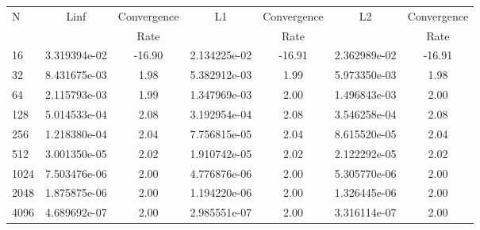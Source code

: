 \documentclass[12pt]{article}
\begin{document}
	\begin{tabular}{l|c|c|c|c|c|c}
		N&Linf&Convergence&L1&Convergence&L2&Convergence\\
		&&Rate&&Rate&&Rate\\
		\hline
		16&3.319394e-02&-16.90&2.134225e-02&-16.91&2.362989e-02&-16.91\\
		\hline
		32&8.431675e-03&1.98&5.382912e-03&1.99&5.973350e-03&1.98\\
		\hline
		64&2.115793e-03&1.99&1.347969e-03&2.00&1.496843e-03&2.00\\
		\hline
		128&5.014533e-04&2.08&3.192954e-04&2.08&3.546258e-04&2.08\\
		\hline
		256&1.218380e-04&2.04&7.756815e-05&2.04&8.615520e-05&2.04\\
		\hline
		512&3.001350e-05&2.02&1.910742e-05&2.02&2.122292e-05&2.02\\
		\hline
		1024&7.503476e-06&2.00&4.776876e-06&2.00&5.305770e-06&2.00\\
		\hline
		2048&1.875875e-06&2.00&1.194220e-06&2.00&1.326445e-06&2.00\\
		\hline
		4096&4.689692e-07&2.00&2.985551e-07&2.00&3.316114e-07&2.00\\
	\end{tabular}
\end{document}
